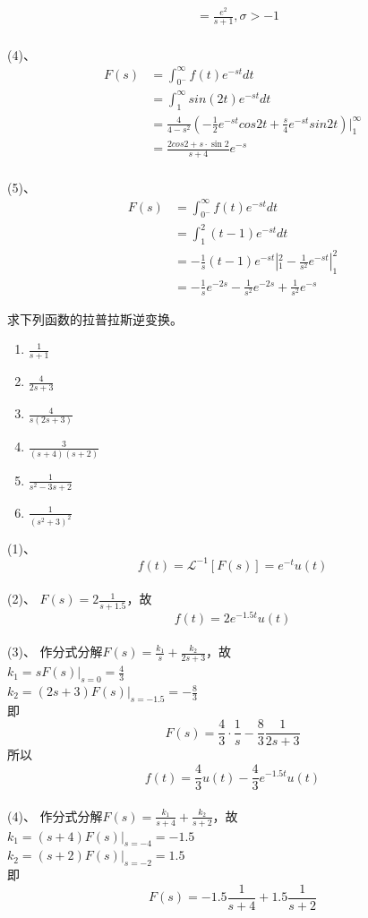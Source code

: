 \documentclass[answers]{exam}  %
\begin{document}
\begin{questions}
\begin{solution}
\begin{align*}
	&=\frac{e^2}{s+1},\sigma>-1
\end{align*}
~\\
(4)、
\begin{align*}
	F(s)&=\int_{0^-}^\infty f(t)e^{-st}dt\\
	&=\int_1^\infty sin(2t)e^{-st}dt\\
	&=\frac{4}{4-s^2}(-\frac{1}{2}e^{-st}cos2t+\frac{s}{4}e^{-st}sin2t)|_1^\infty\\
	&=\frac{2cos2+s\cdot\sin2}{s+4}e^{-s}
\end{align*}
~\\
(5)、
\begin{align*}
	F(s)&=\int_{0^-}^\infty f(t)e^{-st}dt\\
	&=\int_1^2(t-1)e^{-st}dt\\
	&=-\frac{1}{s}(t-1)e^{-st}|_1^2-\frac{1}{s^2}e^{-st}|_1^2\\
	&=-\frac{1}{s}e^{-2s}-\frac{1}{s^2}e^{-2s}+\frac{1}{s^2}e^{-s}
\end{align*}
\end{solution}
\newpage
\question 求下列函数的拉普拉斯逆变换。
\begin{enumerate}[(1)]
\item $\frac{1}{s+1}$
\item $\frac{4}{2s+3}$
\item $\frac{4}{s(2s+3)}$
\item $\frac{3}{(s+4)(s+2)}$
\item $\frac{1}{s^2-3s+2}$
\item $\frac{1}{(s^2+3)^2}$
\end{enumerate}
\begin{solution}
(1)、
$$f(t)=\mathcal{L}^{-1}[F(s)]=e^{-t}u(t)$$
~\\
(2)、
$F(s)=2\frac{1}{s+1.5}$，故$$f(t)=2e^{-1.5t}u(t)$$
~\\
(3)、
作分式分解$F(s)=\frac{k_1}{s}+\frac{k_2}{2s+3}$，故\\
$k_1=sF(s)|_{s=0}=\frac{4}{3}$\\
$k_2=(2s+3)F(s)|_{s=-1.5}=-\frac{8}{3}$\\
即$$F(s)=\frac{4}{3}\cdot\frac{1}{s}-\frac{8}{3}\frac{1}{2s+3}$$
所以$$f(t)=\frac{4}{3}u(t)-\frac{4}{3}e^{-1.5t}u(t)$$
~\\
(4)、
作分式分解$F(s)=\frac{k_1}{s+4}+\frac{k_2}{s+2}$，故\\
$k_1=(s+4)F(s)|_{s=-4}=-1.5$\\
$k_2=(s+2)F(s)|_{s=-2}=1.5$\\
即$$F(s)=-1.5\frac{1}{s+4}+1.5\frac{1}{s+2}$$

\end{solution}
\end{questions}
\end{document}
